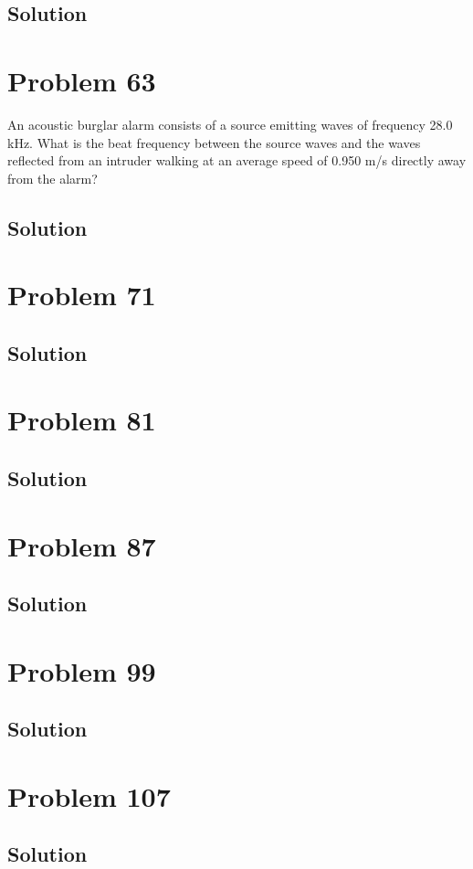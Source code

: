 \documentclass[12pt]{article}
\begin{document}
        \subsection{Solution}

    \pagebreak
    \section{Problem 63}
        An acoustic burglar alarm consists of a source emitting waves of frequency 28.0 kHz. 
        What is the beat frequency between the source waves and the waves reflected from an intruder walking at an average speed of 0.950 m/s directly away from the alarm?

        \subsection{Solution}

    \pagebreak
    \section{Problem 71}

        \subsection{Solution}

    \pagebreak
    \section{Problem 81}

        \subsection{Solution}

    \pagebreak
    \section{Problem 87}

        \subsection{Solution}

    \pagebreak
    \section{Problem 99}

        \subsection{Solution}

    \pagebreak
    \section{Problem 107}

        \subsection{Solution}

    \pagebreak

    \tableofcontents
\end{document}
